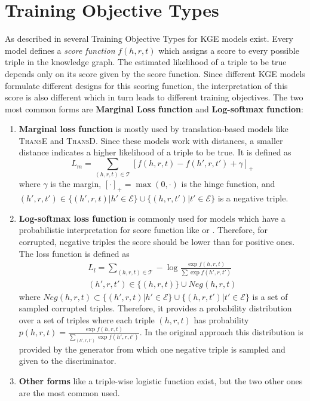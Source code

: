 \section{Training Objective Types} 
\label{sec:training_objective_types}


As described in \cite{cai2017kbgan} several Training Objective Types for \ac{KGE} models exist.
Every model defines a \textit{score function} $f(h,r,t)$ which assigns a score to every possible triple in the knowledge graph.
The estimated likelihood of a triple to be true depends only on its score given by the score function.
Since different \ac{KGE} models formulate different designs for this scoring function, the interpretation of this score is also different which in turn leads to different training objectives.
The two most common forms are \textbf{Marginal Loss function} and \textbf{Log-softmax function}:
\begin{enumerate}
    \item \textbf{Marginal loss function} is mostly used by translation-based models like \textsc{TransE} and \textsc{TransD}.
    Since these models work with distances, a smaller distance indicates a higher likelihood of a triple to be true.
    It is defined as 
    \begin{equation}
        L_{m}=\sum_{(h,r,t)\in\mathcal{T}}[f(h,r,t)-f(h',r,t')+\gamma]_+\label{eq:marginalloss}
    \end{equation}
    where $\gamma$ is the margin, $[\cdot]_+=\max(0,\cdot)$ is the hinge function, and $(h',r,t')\in\{(h',r,t)|h'\in\mathcal{E}\}\cup\{(h,r,t')|t'\in\mathcal{E}\}$ is a negative triple.
    
    \item \textbf{Log-softmax loss function} is commonly used for models which have a probabilistic interpretation for score function like \distmult or \complex.
    Therefore, for corrupted, negative triples the score should be lower than for positive ones.
    The loss function is defined as
    \begin{multline}
        L_{l}=\sum_{(h,r,t)\in\mathcal{T}}-\log \frac{\exp f(h,r,t)}{\sum\exp f(h',r,t')}\\
        (h',r,t')\in\{(h,r,t)\}\cup Neg(h,r,t)\label{eq:nllloss}
    \end{multline}
    where $Neg(h,r,t)\subset\{(h',r,t)|h'\in\mathcal{E}\}\cup\{(h,r,t')|t'\in\mathcal{E}\}$ is a set of sampled corrupted triples.
    Therefore, it provides a probability distribution over a set of triples where each triple $(h, r, t)$ has probability $p(h,r,t)=\frac{\exp f(h,r,t)}{\sum_{(h',r,t')}\exp f(h',r,t')}$.
    In the original \kbgan approach this distribution is provided by the generator from which one negative triple is sampled and given to the discriminator.

    \item \textbf{Other forms} like a triple-wise logistic function \cite{ConvE} exist, but the two other ones are the most common used.
\end{enumerate}